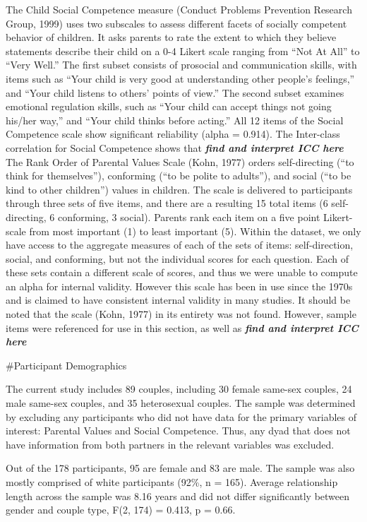 \documentclass[man]{apa6}
\begin{document}
The Child Social Competence measure (Conduct Problems Prevention Research Group, 1999) uses two subscales to assess different facets of socially competent behavior of children. It asks parents to rate the extent to which they believe statements describe their child on a 0-4 Likert scale ranging from \enquote{Not At All} to \enquote{Very Well.} The first subset consists of prosocial and communication skills, with items such as \enquote{Your child is very good at understanding other people's feelings,} and \enquote{Your child listens to others' points of view.} The second subset examines emotional regulation skills, such as \enquote{Your child can accept things not going his/her way,} and \enquote{Your child thinks before acting.} All 12 items of the Social Competence scale show significant reliability (alpha = 0.914). The Inter-class correlation for Social Competence shows that \textbf{\emph{find and interpret ICC here}}
The Rank Order of Parental Values Scale (Kohn, 1977) orders self-directing (\enquote{to think for themselves}), conforming (\enquote{to be polite to adults}), and social (\enquote{to be kind to other children}) values in children. The scale is delivered to participants through three sets of five items, and there are a resulting 15 total items (6 self-directing, 6 conforming, 3 social). Parents rank each item on a five point Likert-scale from most important (1) to least important (5). Within the dataset, we only have access to the aggregate measures of each of the sets of items: self-direction, social, and conforming, but not the individual scores for each question. Each of these sets contain a different scale of scores, and thus we were unable to compute an alpha for internal validity. However this scale has been in use since the 1970s and is claimed to have consistent internal validity in many studies. It should be noted that the scale (Kohn, 1977) in its entirety was not found. However, sample items were referenced for use in this section, as well as \textbf{\emph{find and interpret ICC here }}

\#Participant Demographics

The current study includes 89 couples, including 30 female same-sex couples, 24 male same-sex couples, and 35 heterosexual couples. The sample was determined by excluding any participants who did not have data for the primary variables of interest: Parental Values and Social Competence. Thus, any dyad that does not have information from both partners in the relevant variables was excluded.

Out of the 178 participants, 95 are female and 83 are male. The sample was also mostly comprised of white participants (92\%, n = 165). Average relationship length across the sample was 8.16 years and did not differ significantly between gender and couple type, F(2, 174) = 0.413, p = 0.66.
\end{document}
